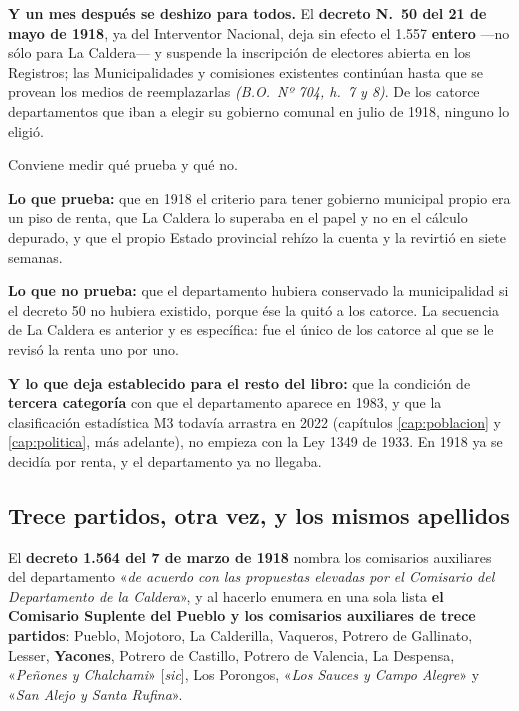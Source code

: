 \textbf{Y un mes después se deshizo para todos.} El \textbf{decreto N.\ 50 del 21 de mayo de
1918}, ya del Interventor Nacional, deja sin efecto el 1.557 \textbf{entero} ---no sólo para La
Caldera--- y suspende la inscripción de electores abierta en los Registros; las Municipalidades y
comisiones existentes continúan hasta que se provean los medios de reemplazarlas
\textit{(B.O.\ Nº 704, h.\ 7 y 8)}. De los catorce departamentos que iban a elegir su gobierno
comunal en julio de 1918, ninguno lo eligió.

\begin{cautela}
Conviene medir qué prueba y qué no.

\textbf{Lo que prueba:} que en 1918 el criterio para tener gobierno municipal propio era un piso
de renta, que La Caldera lo superaba en el papel y no en el cálculo depurado, y que el propio
Estado provincial rehízo la cuenta y la revirtió en siete semanas.

\textbf{Lo que no prueba:} que el departamento hubiera conservado la municipalidad si el decreto
50 no hubiera existido, porque ése la quitó a los catorce. La secuencia de La Caldera es anterior
y es específica: fue el único de los catorce al que se le revisó la renta uno por uno.

\textbf{Y lo que deja establecido para el resto del libro:} que la condición de \textbf{tercera
categoría} con que el departamento aparece en 1983, y que la clasificación estadística M3
todavía arrastra en 2022 (capítulos \ref{cap:poblacion} y \ref{cap:politica}, más adelante), no empieza con la
Ley 1349 de 1933. En 1918 ya se decidía por renta, y el departamento ya no llegaba.
\end{cautela}

\subsection*{Trece partidos, otra vez, y los mismos apellidos}

El \textbf{decreto 1.564 del 7 de marzo de 1918} nombra los comisarios auxiliares del
departamento «\textit{de acuerdo con las propuestas elevadas por el Comisario del Departamento de
la Caldera}», y al hacerlo enumera en una sola lista \textbf{el Comisario Suplente del Pueblo y
los comisarios auxiliares de trece partidos}: Pueblo, Mojotoro, La
Calderilla, Vaqueros, Potrero de Gallinato, Lesser, \textbf{Yacones}, Potrero de Castillo, Potrero
de Valencia, La Despensa, «\textit{Peñones y Chalchami}» [\textit{sic}], Los Porongos, «\textit{Los
Sauces y Campo Alegre}» y «\textit{San Alejo y Santa Rufina}».

